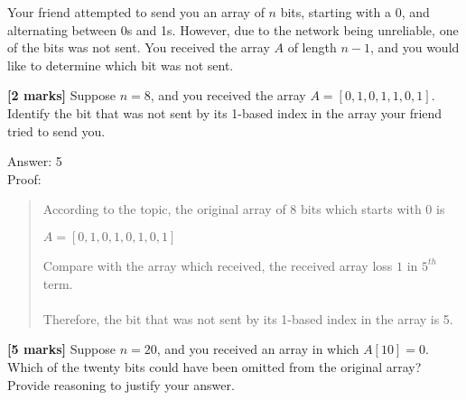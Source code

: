 \documentclass{article}
\begin{document}
\setcounter{question}{0}

\begin{Question}
Your friend attempted to send you an array of $n$ bits, starting with a 0, and alternating between 0s and 1s. However, due to the network being unreliable, one of the bits was not sent. You received the array $A$ of length $n-1$, and you would like to determine which bit was not sent.

\begin{Subquestion}
\textbf{[2 marks]} Suppose $n=8$, and you received the array $A = [0,1,0,1,1,0,1]$. Identify the bit that was not sent by its 1-based index in the array your friend tried to send you.

\begin{answer}
Answer: 5\\
Proof:
\begin{quote}
    According to the topic, the original array of 8 bits which starts with 0 is
\begin{center}
    $A = [0,1,0,1,0,1,0,1]$\\
\end{center}
Compare with the array which received, the received array loss $1$ in $5^{th}$ term.\\\\
Therefore, the bit that was not sent by its 1-based index in the array is 5.\\
\end{quote}
\end{answer}
\end{Subquestion}

\begin{Subquestion}\label{bitstring-midpoint}
\textbf{[5 marks]} Suppose $n = 20$, and you received an array in which $A[10] = 0$. Which of the twenty bits could have been omitted from the original array? Provide reasoning to justify your answer.


\end{Subquestion}
\end{Question}
\end{document}
